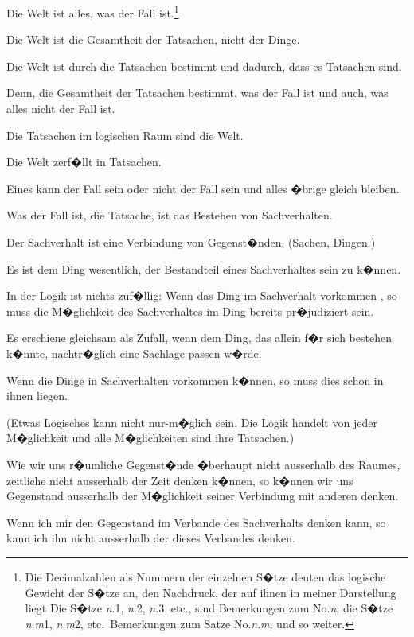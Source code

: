 
{Die Welt ist alles, was der Fall ist.\footnote{Die Decimalzahlen als Nummern der einzelnen S�tze deuten das logische
Gewicht der S�tze an, den Nachdruck, der auf ihnen in meiner Darstellung liegt
Die S�tze \textit{n}.1, \textit{n}.2, \textit{n}.3, etc., sind Bemerkungen zum  No.\;\textit{n}; die S�tze \textit{n}.\textit{m}1,
\textit{n}.\textit{m}2, etc.\ Bemerkungen zum Satze No.\;\textit{n}.\textit{m}; und so weiter.}}


{Die Welt ist die Gesamtheit der Tatsachen,
nicht der Dinge.}


{Die Welt ist durch die Tatsachen bestimmt und
dadurch, dass es  Tatsachen sind.}


{Denn, die Gesamtheit der Tatsachen bestimmt,
was der Fall ist und auch, was alles nicht der Fall ist.}


{Die Tatsachen im logischen Raum sind die Welt.}


{Die Welt zerf�llt in Tatsachen.}


{Eines kann der Fall sein oder nicht der Fall sein
und alles �brige gleich bleiben.}


{Was der Fall ist, die Tatsache, ist das Bestehen
von Sachverhalten.}


{Der Sachverhalt ist eine Verbindung von
Gegenst�nden. (Sachen, Dingen.)}


{Es ist dem Ding wesentlich, der Bestandteil
eines Sachverhaltes sein zu k�nnen.}


{In der Logik ist nichts zuf�llig: Wenn das Ding
im Sachverhalt vorkommen , so muss die
M�glichkeit des Sachverhaltes im Ding bereits
pr�judiziert sein.}


{Es erschiene gleichsam als Zufall, wenn dem
Ding, das allein f�r sich bestehen k�nnte, nachtr�glich
eine Sachlage passen w�rde.

Wenn die Dinge in Sachverhalten vorkommen
k�nnen, so muss dies schon in ihnen liegen.

(Etwas Logisches kann nicht nur-m�glich sein.
Die Logik handelt von jeder M�glichkeit und alle
M�glichkeiten sind ihre Tatsachen.)

Wie wir uns r�umliche Gegenst�nde �berhaupt
nicht ausserhalb des Raumes, zeitliche nicht ausserhalb
der Zeit denken k�nnen, so k�nnen wir uns
 Gegenstand ausserhalb der M�glichkeit
seiner Verbindung mit anderen denken.

Wenn ich mir den Gegenstand im Verbande
des Sachverhalts denken kann, so kann ich ihn
nicht ausserhalb der  dieses Verbandes
denken.}


